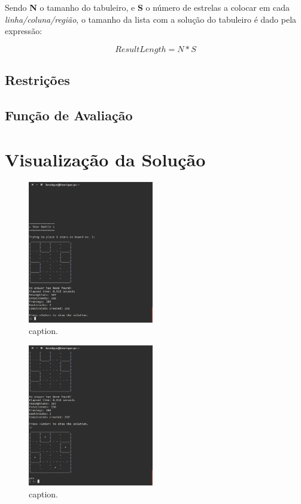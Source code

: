 \documentclass[runningheads,a4paper]{llncs}
\begin{document}
Sendo \textbf{N} o tamanho do tabuleiro, e \textbf{S} o número de estrelas a colocar em cada \emph{linha/coluna/região}, o tamanho da lista com a solução do tabuleiro é dado pela expressão:

\begin{equation}
ResultLength = N * S
\end{equation}


\subsection{Restrições}

\subsection{Função de Avaliação}


\section{Visualização da Solução}

\begin{figure}
\centering
\includegraphics[height=6.2cm]{res/testBoard4x4_1}
\caption{caption.}
\label{fig:example}
\end{figure}

\begin{figure}
\centering
\includegraphics[height=6.2cm]{res/testBoard4x4_1-solution}
\caption{caption.}
\label{fig:example}
\end{figure}
\end{document}
